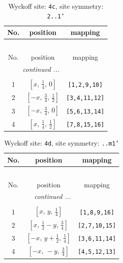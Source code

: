 \documentclass[fleqn,8pt]{jsarticle}
\begin{document}
\renewcommand{\arraystretch}{1.2}
\begin{longtable}{ccc}
\caption{Wyckoff site: {\tt 4c}, site symmetry: {\tt 2..1'}}
 \\
 \hline \hline
No. & position & mapping \\ \hline \endfirsthead

\multicolumn{2}{l}{\tablename\ \thetable{}} \\
 \hline \hline
No. & position & mapping \\ \hline \endhead

 \hline \hline
\multicolumn{2}{r}{\footnotesize\it continued ...} \\ \endfoot

 \hline \hline
\multicolumn{2}{r}{} \\ \endlastfoot

1 & $\left[ x,\, \frac{1}{4},\, 0 \right]$ & {\tt [1,2,9,10]} \\ \hline
2 & $\left[ - x,\, \frac{3}{4},\, \frac{1}{2} \right]$ & {\tt [3,4,11,12]} \\ \hline
3 & $\left[ - x,\, \frac{3}{4},\, 0 \right]$ & {\tt [5,6,13,14]} \\ \hline
4 & $\left[ x,\, \frac{1}{4},\, \frac{1}{2} \right]$ & {\tt [7,8,15,16]} \\
\end{longtable}
\renewcommand{\arraystretch}{1.2}
\begin{longtable}{ccc}
\caption{Wyckoff site: {\tt 4d}, site symmetry: {\tt ..m1'}}
 \\
 \hline \hline
No. & position & mapping \\ \hline \endfirsthead

\multicolumn{2}{l}{\tablename\ \thetable{}} \\
 \hline \hline
No. & position & mapping \\ \hline \endhead

 \hline \hline
\multicolumn{2}{r}{\footnotesize\it continued ...} \\ \endfoot

 \hline \hline
\multicolumn{2}{r}{} \\ \endlastfoot

1 & $\left[ x,\, y,\, \frac{1}{4} \right]$ & {\tt [1,8,9,16]} \\ \hline
2 & $\left[ x,\, \frac{1}{2} - y,\, \frac{3}{4} \right]$ & {\tt [2,7,10,15]} \\ \hline
3 & $\left[ - x,\, y + \frac{1}{2},\, \frac{1}{4} \right]$ & {\tt [3,6,11,14]} \\ \hline
4 & $\left[ - x,\, - y,\, \frac{3}{4} \right]$ & {\tt [4,5,12,13]} \\
\end{longtable}
\end{document}
